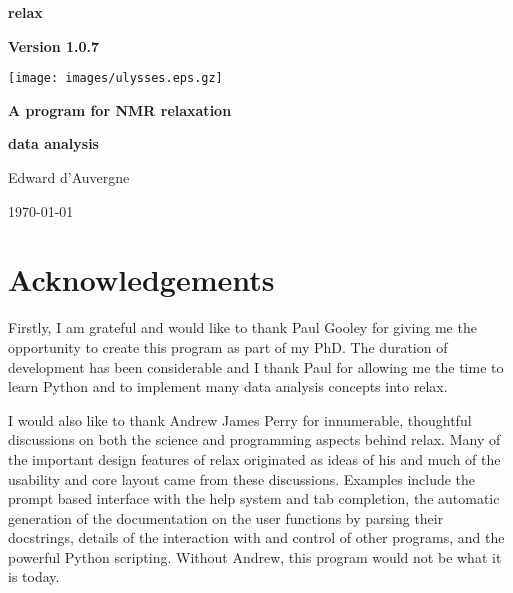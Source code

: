 \documentclass[a4paper, 11pt, twoside, openright]{book}
\begin{document}
\frontmatter



\begin{titlepage}
\begin{center}


{\Huge \textbf{relax}}

{\LARGE \textbf{Version 1.0.7}}

\centerline{\texttt{[image: images/ulysses.eps.gz]}}

{\huge \textbf{A program for NMR relaxation}}

{\huge \textbf{data analysis}}

{\Large Edward d'Auvergne}

{\large \today}

\end{center}
\end{titlepage}



\chapter*{Acknowledgements}

Firstly, I am grateful and would like to thank Paul Gooley for giving me the opportunity to create this program as part of my PhD.  The duration of development has been considerable and I thank Paul for allowing me the time to learn Python and to implement many data analysis concepts into relax.

I would also like to thank Andrew James Perry for innumerable, thoughtful discussions on both the science and programming aspects behind relax.  Many of the important design features of relax originated as ideas of his and much of the usability and core layout came from these discussions.  Examples include the prompt based interface with the help system and tab completion, the automatic generation of the documentation on the user functions by parsing their docstrings, details of the interaction with and control of other programs, and the powerful Python scripting.  Without Andrew, this program would not be what it is today.
\end{document}
